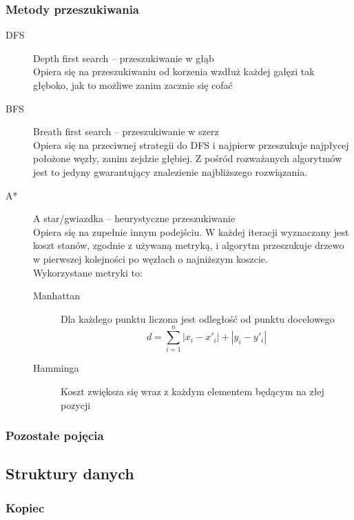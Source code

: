 \documentclass{classrep}
\begin{document}
\subsubsection{Metody przeszukiwania}
\begin{description}
    \item [DFS] Depth first search -- przeszukiwanie w głąb\\ 
    Opiera się na przeszukiwaniu od korzenia wzdłuż każdej gałęzi tak głęboko, jak to możliwe zanim zacznie się cofać
    \item [BFS] Breath first search -- przeszukiwanie w szerz\\
    Opiera się na przeciwnej strategii do DFS i najpierw przeszukuje najpłycej położone węzły, zanim zejdzie głębiej.
    Z pośród rozważanych algorytmów jest to jedyny gwarantujący znalezienie najbliższego rozwiązania.
    \item [A*]  A star/gwiazdka -- heurystyczne przeszukiwanie\\
    Opiera się na zupełnie innym podejściu.
    W każdej iteracji wyznaczany jest koszt stanów, zgodnie z używaną metryką, i algorytm przeszukuje drzewo w pierwszej kolejności po węzłach o najniższym koszcie.
    \\
    Wykorzystane metryki to:
    \begin{description}
        \item [Manhattan] Dla każdego punktu liczona jest odległość od punktu docelowego
        \[d=\sum_{i=1}^{n} |x_i-x'_i|+|y_i-y'_i|\] 
        \item [Hamminga] Koszt zwiększa się wraz z każdym elementem będącym na złej pozycji
    \end{description}
\end{description}

\subsubsection{Pozostałe pojęcia}
\begin{description}
    \item [Cykl]
    \item [Droga]
    \item 
\end{description}

\subsection{Struktury danych}
\subsubsection{Kopiec}
\end{document}
